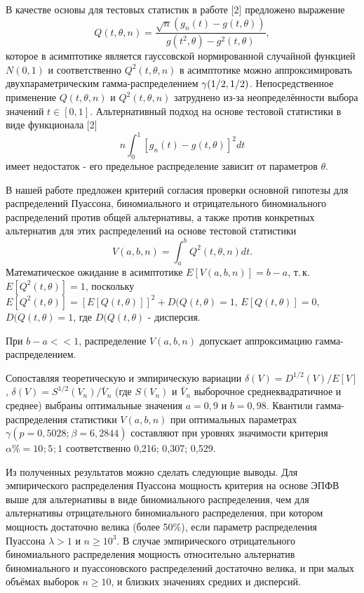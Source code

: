 В качестве основы для тестовых статистик в работе [2] предложено выражение
\[Q(t,\theta ,n)=\frac{\sqrt{n} \left(g_{n} (t)-g(t,\theta )\right)}{g(t^{2} ,\theta )-g^{2} (t,\theta )} ,\]
которое в асимптотике является гауссовской нормированной случайной функцией
 $N(0,1)$  и соответственно $Q^{2} (t,\theta ,n)$ в асимптотике можно аппроксимировать двухпараметрическим гамма-распределением $\gamma ({1 \mathord{\left/{\vphantom{1 2}}\right.\kern-\nulldelimiterspace} 2} ,{1 \mathord{\left/{\vphantom{1 2}}\right.\kern-\nulldelimiterspace} 2} )$. Непосредственное применение $Q(t,\theta ,n)$ и $Q^{2} (t,\theta ,n)$ затруднено из-за неопределённости выбора значений $t\in [0,1]$. Альтернативный подход на основе тестовой статистики в виде функционала [2]
\[n\int _{0}^{1}\left[g_{n} (t)-g(t,\theta )\right]^{2} dt \]
имеет недостаток  - его предельное распределение зависит от параметров $\theta $.

В нашей работе предложен критерий согласия проверки основной гипотезы для распределений Пуассона, биномиального и  отрицательного биномиального распределений против общей альтернативы, а также против конкретных альтернатив для этих распределений на основе тестовой статистики
\[V(a,b,n)=\int _{a}^{b}Q^{2} (t,\theta ,n)dt .\]
Математическое ожидание в асимптотике $E[V(a,b,n)]=b-a$, т.\,к. $E[Q^{2} (t,\theta )]=1$,
поскольку $E[Q^{2} (t,\theta )]=[E[Q(t,\theta )]]^{2} +D(Q(t,\theta )=1$,  $E[Q(t,\theta )]=0$, $D(Q(t,\theta )=1$, где $D(Q(t,\theta )$ - дисперсия.

При $b-a<<1$, распределение $V(a,b,n)$ допускает аппроксимацию гамма-распределением.


 Сопоставляя теоретическую и эмпирическую вариации $\delta (V)=D^{1/2} (V)/E[V]$, $\delta  (V)=S^{1/2} (V_{n} )/\bar{V}_{n} $ (где $S(V_{n} )$ и $\bar{V}_{n} $ выборочное среднеквадратичное  и среднее) выбраны оптимальные значения $a=0,9$ и $b=0,98$. Квантили  гамма-распределения статистики $V(a,b,n)$ при оптимальных параметрах $\gamma (p=0,5028;_{} \beta =6,2844)$ составляют при уровнях значимости критерия $\alpha \% =10_{}  ;5_{}  ;1$  соответственно 0,216;   0,307;  0,529.


Из полученных результатов можно сделать следующие выводы.
Для эмпирического распределения Пуассона мощность критерия на основе ЭПФВ выше для альтернативы в виде биномиального распределения,
чем для альтернативы отрицательного биномиального распределения,
при котором мощность достаточно велика (более 50\%), если параметр распределения Пуассона  $\lambda >1$ и $n\geqslant 10^{3} $.
В случае эмпирического отрицательного биномиального распределения мощность относительно альтернатив
биномиального и пуассоновского распределений достаточно велика, и при малых объёмах выборок $n\geqslant 10$,
и близких значениях средних и дисперсий.

